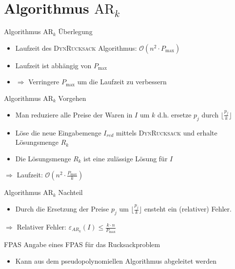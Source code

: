 \section{Algorithmus $\text{AR}_k$}
\begin{frame}{Algorithmus $\text{AR}_k$ Überlegung}	
	\begin{itemize}
		\item 
		Laufzeit des \textsc{DynRucksack} Algorithmus: $\mathcal O(n^2 \cdot P_{\max})$ 
		\item
		Laufzeit ist abhängig von $P_{\max}$
		\item
		$\Rightarrow$ Verringere $P_{\max}$ um die Laufzeit zu verbessern
	\end{itemize}
\end{frame}
\begin{frame}{Algorithmus $\text{AR}_k$ Vorgehen}	
	\begin{itemize}
		\item 
		Man reduziere alle Preise der Waren in $I$ um $k$ d.h. ersetze $p_j$ durch $\displaystyle \lfloor \frac {p_j}{k} \rfloor $
		\item
		Löse die neue Eingabemenge $I_{red}$ mittels \textsc{DynRucksack} und erhalte Lösungsmenge $R_k$
		\item
		Die Lösungsmenge $R_k$ ist eine zulässige Lösung für $I$
		
	\end{itemize}
	$\Rightarrow$ Laufzeit: $\displaystyle \mathcal O(n^2 \cdot \frac{P_{\max}}{k})$
\end{frame}

\begin{frame}{Algorithmus $\text{AR}_k$ Nachteil}	
	\begin{itemize}
		\item 
		Durch die Ersetzung der Preise $p_j$ um $\displaystyle \lfloor \frac {p_j}{k} \rfloor $ ensteht ein (relativer) Fehler.
		
	\end{itemize}
	$\Rightarrow$ Relativer Fehler: $\varepsilon_{AR_k}(I) \le \frac{k \cdot n}{P_{\max}}$
\end{frame}

\begin{frame}{FPAS}
Angabe eines FPAS für das Rucksackproblem
	\begin{itemize}
		\item Kann aus dem pseudopolynomiellen Algorithmus abgeleitet werden
	\end{itemize}
\end{frame}

